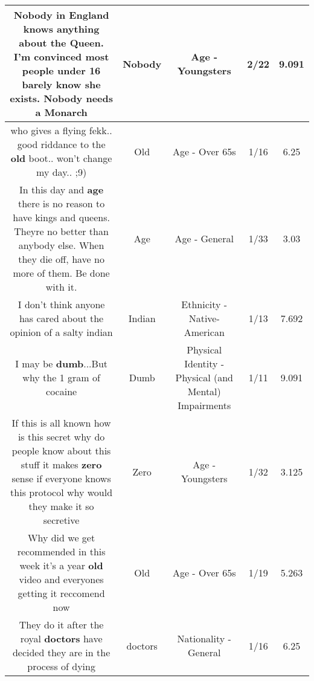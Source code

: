 \documentclass[11pt]{article}
\newlength\mylength
\begin{document}
\begin{center}
\begin{longtable}{|C{.65\mylength}|C{.30\mylength}|C{.12\mylength}|C{.12\mylength}|C{.12\mylength}|}
  \small Nobody in England knows anything about the Queen. I'm convinced most people under 16 barely know she exists. \textbf{Nobody} needs a Monarch\normalsize   & Nobody & Age - Youngsters & 2/22 & 9.091 \\  \hline
  \small who gives a flying fekk.. good riddance to the \textbf{old} boot.. won't change my day.. ;9)\normalsize   & Old & Age - Over 65s & 1/16 & 6.25 \\  \hline
  \small In this day and \textbf{age} there is no reason to have kings and queens. Theyre no better than anybody else. When they die off, have no more of them. Be done with it.\normalsize   & Age & Age - General & 1/33 & 3.03 \\  \hline
  \small I don't think anyone has cared about the opinion of a salty indian\normalsize   & Indian & Ethnicity - Native-American & 1/13 & 7.692 \\  \hline
  \small I may be \textbf{dumb}...But why the 1 gram of cocaine\normalsize   & Dumb & Physical Identity - Physical (and Mental) Impairments & 1/11 & 9.091 \\  \hline
  \small If this is all known how is this secret why do people know about this stuff it makes \textbf{zero} sense if everyone knows this protocol why would they make it so secretive\normalsize   & Zero & Age - Youngsters & 1/32 & 3.125 \\  \hline
  \small Why did we get recommended in this week it's a year \textbf{old} video and everyones getting it reccomend now\normalsize   & Old & Age - Over 65s & 1/19 & 5.263 \\  \hline
  \small They do it after the royal \textbf{doctors} have decided they are in the process of dying\normalsize   & doctors & Nationality - General & 1/16 & 6.25 \\  \hline

\end{longtable}
\end{center}
\end{document}
